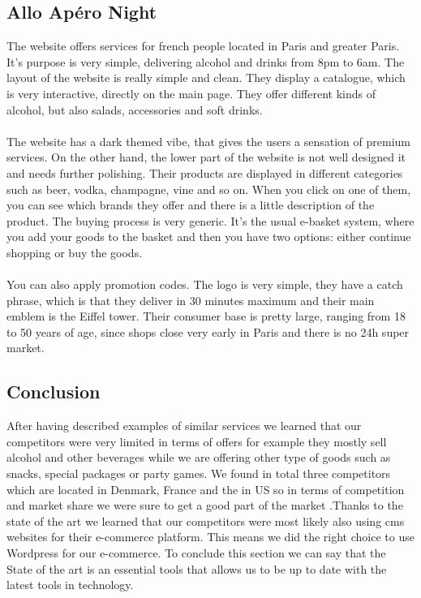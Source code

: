 \documentclass[12p]{article}
\begin{document}
\subsection{Allo Apéro Night \cite{alloAperoNight}}
The website offers services for french people located in Paris and greater Paris.
It’s purpose is very simple, delivering alcohol and drinks from 8pm to 6am.
The layout of the website is really simple and clean. They display a catalogue, which is very interactive, directly on the main page. They offer different kinds of alcohol, but also salads, accessories and soft drinks. 
\\ \\
The website has a dark themed vibe, that gives the users a sensation of premium services.
On the other hand, the lower part of the website is not well designed it and needs further polishing.
Their products are displayed in different categories such as beer, vodka, champagne, vine and so on.
When you click on one of them, you can see which brands they offer and there is a little description of the product.
The buying process is very generic. It’s the usual e-basket system, where you add your goods to the basket and then you have two options: either continue shopping or buy the goods.
\\ \\
You can also apply promotion codes.
The logo is very  simple, they have a catch phrase, which is that they deliver in 30 minutes maximum and their main emblem is the Eiffel tower.
Their consumer base is pretty large, ranging from 18 to 50 years of age, since shops close very early in Paris and there is no 24h super market.


\subsection{Conclusion}
After having described examples of similar services we learned that our competitors were very limited in terms of offers for example they mostly sell alcohol and other beverages while we are offering other type of goods such as snacks, special packages or party games. We found in total three competitors which are located in Denmark, France and the in US so in terms of competition and market share we were sure to get a good part of the market .Thanks to the state of the art we learned that our competitors were most likely also using cms websites for their e-commerce platform. This means we did the right choice to use Wordpress for our e-commerce. To conclude this section we can say that the State of the art is an essential tools that allows us to be up to date with the latest tools in technology.
\end{document}
